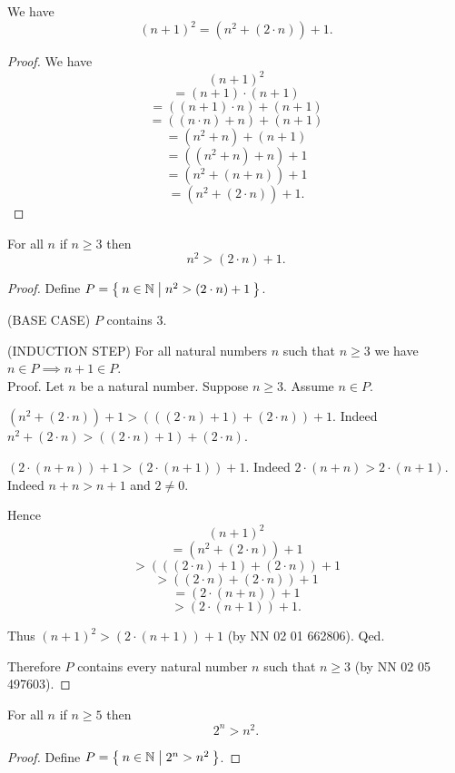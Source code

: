 \documentclass[../../natural-numbers.ftl.tex]{subfiles}
\begin{document}
  \begin{forthel}
    \begin{proposition}[NN 02 06 276270]
      We have \[ (n + 1)^{2} = (n^{2} + (2 \cdot n)) + 1. \]
    \end{proposition}
    \begin{proof}
      We have
      \[   (n + 1)^{2} \]
      \[ = (n + 1) \cdot (n + 1) \]
      \[ = ((n + 1) \cdot n) + (n + 1) \]
      \[ = ((n \cdot n) + n) + (n + 1) \]
      \[ = (n^{2} + n) + (n + 1) \]
      \[ = ((n^{2} + n) + n) + 1 \]
      \[ = (n^{2} + (n + n)) + 1 \]
      \[ = (n^{2} + (2 \cdot n)) + 1. \]
    \end{proof}


    \begin{proposition}[NN 02 06 671464]
      For all $n$ if $n \geq 3$ then \[ n^{2} > (2 \cdot n) + 1. \]
    \end{proposition}
    \begin{proof}
      Define $P = \Set{n \in \mathbb{N} | n^{2} > (2 \cdot n) + 1}$.

      (BASE CASE) $P$ contains $3$.

      (INDUCTION STEP) For all natural numbers $n$ such that $n \geq 3$ we have $n \in P \implies n + 1 \in P$. \\
      Proof.
        Let $n$ be a natural number.
        Suppose $n \geq 3$.
        Assume $n \in P$.

        $(n^{2} + (2 \cdot n)) + 1 > (((2 \cdot n) + 1) + (2 \cdot n)) + 1$.
        Indeed $n^{2} + (2 \cdot n) > ((2 \cdot n) + 1) + (2 \cdot n)$.

        $(2 \cdot (n + n)) + 1 > (2 \cdot (n + 1)) + 1$.
        Indeed $2 \cdot (n + n) > 2 \cdot (n + 1)$.
        Indeed $n + n > n + 1$ and $2 \neq 0$.

        Hence
        \[   (n + 1)^{2} \]
        \[ = (n^{2} + (2 \cdot n)) + 1 \]
        \[ > (((2 \cdot n) + 1) + (2 \cdot n)) + 1 \]
        \[ > ((2 \cdot n) + (2 \cdot n)) + 1 \]
        \[ = (2 \cdot (n + n)) + 1 \]
        \[ > (2 \cdot (n + 1)) + 1. \]

        Thus $(n + 1)^{2} > (2 \cdot (n + 1)) + 1$ (by NN 02 01 662806).
      Qed.

      Therefore $P$ contains every natural number $n$ such that $n \geq 3$ (by NN 02 05 497603).
    \end{proof}


    \begin{proposition}[NN 02 06 205395]
      For all $n$ if $n \geq 5$ then \[ 2^{n} > n^{2}. \]
    \end{proposition}
    \begin{proof}
      Define $P = \Set{n \in \mathbb{N} | 2^{n} > n^{2}}$.


\end{proof}
\end{forthel}
\end{document}
